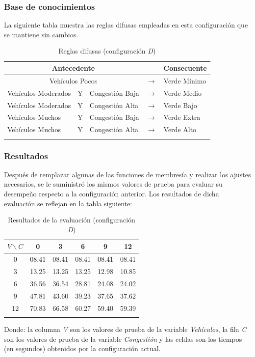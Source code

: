 \subsubsection{Base de conocimientos}
La siguiente tabla muestra las reglas difusas empleadas en esta configuración que se mantiene sin cambios.\\
\begin{longtable}[c]{lclcl} \toprule
	\multicolumn{3}{c}{Antecedente} & & Consecuente \\ \midrule
	\multicolumn{3}{c}{Vehículos Pocos} & $\rightarrow$ & Verde Mínimo \\
	Vehículos Moderados & Y & Congestión Baja& $\rightarrow$ & Verde Medio \\
	Vehículos Moderados & Y & Congestión Alta& $\rightarrow$ & Verde Bajo \\
	Vehículos Muchos &Y& Congestión Baja& $\rightarrow$ & Verde Extra \\
	Vehículos Muchos &Y& Congestión Alta& $\rightarrow$ & Verde Alto \\ \hline
	\caption{Reglas difusas (configuración \textit{D})}
\end{longtable}

\pagebreak
\subsubsection{Resultados}
Después de remplazar algunas de las funciones de membresía y realizar los ajustes necesarios, se le suministró los mismos valores de prueba para evaluar su desempeño respecto a la configuración anterior. Los resultados de dicha evaluación se reflejan en la tabla siguiente:\\

\begin{longtable}[c]{cccccc} \toprule
	$V \backslash C$ &  0 & 3 & 6 & 9 & 12 \\ \midrule
	0 & 08.41 & 08.41 & 08.41 & 08.41 & 08.41 \\
	3 & 13.25 & 13.25 & 13.25 & 12.98 & 10.85 \\
	6 & 36.56 & 36.54 & 28.81 & 24.08 & 24.02 \\
	9 & 47.81 & 43.60 & 39.23 & 37.65 & 37.62 \\
	12& 70.83 & 66.58 & 60.27 & 59.40 & 59.39 \\
	\caption{Resultados de la evaluación (configuración \textit{D})}
\end{longtable}

Donde: la columna \textit{V} son los valores de prueba de la variable \textit{Vehículos}, la fila \textit{C} son los valores de  prueba de la variable \textit{Congestión} y las celdas son los tiempos (en segundos) obtenidos por la configuración actual.\\

